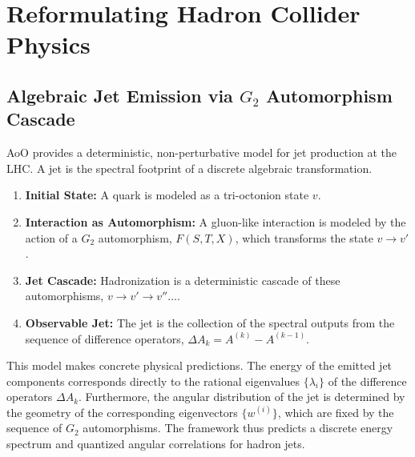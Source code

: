 \documentclass[11pt, a4paper]{article}
\theoremstyle{definition}
\theoremstyle{remark}
\begin{document}
\section{Reformulating Hadron Collider Physics}

\subsection{Algebraic Jet Emission via $G_2$ Automorphism Cascade}
AoO provides a deterministic, non-perturbative model for jet production at the LHC. A jet is the spectral footprint of a discrete algebraic transformation.

\begin{enumerate}
    \item \textbf{Initial State:} A quark is modeled as a tri-octonion state $v$.
    \item \textbf{Interaction as Automorphism:} A gluon-like interaction is modeled by the action of a $G_2$ automorphism, $F(S,T,X)$, which transforms the state $v \to v'$.
    \item \textbf{Jet Cascade:} Hadronization is a deterministic cascade of these automorphisms, $v \to v' \to v'' \dots$.
    \item \textbf{Observable Jet:} The jet is the collection of the spectral outputs from the sequence of difference operators, $\Delta A_k = A^{(k)} - A^{(k-1)}$.
\end{enumerate}

This model makes concrete physical predictions. The energy of the emitted jet components corresponds directly to the rational eigenvalues $\{\lambda_i\}$ of the difference operators $\Delta A_k$. Furthermore, the angular distribution of the jet is determined by the geometry of the corresponding eigenvectors $\{w^{(i)}\}$, which are fixed by the sequence of $G_2$ automorphisms. The framework thus predicts a discrete energy spectrum and quantized angular correlations for hadron jets.
\end{document}
